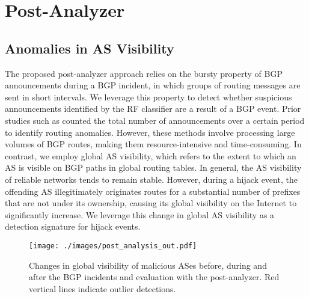 \vspace{-5pt}
\section{Post-Analyzer} \label{subsec:lov_post_analyzer}


\subsection{Anomalies in AS Visibility}
The proposed post-analyzer approach relies on the bursty property of BGP announcements during a BGP incident, in which groups of routing messages are sent in short intervals.
We leverage this property to detect whether suspicious announcements identified by the RF classifier are a result of a BGP event. Prior studies such as \cite{moriano2021using, deshpande2009online} counted the total number of announcements over a certain period to identify routing anomalies. However, these methods involve processing large volumes of BGP routes, making them resource-intensive and time-consuming.
In contrast, we employ global AS visibility, which refers to the extent to which an AS is visible on BGP paths in global routing tables.
In general, the AS visibility of reliable networks tends to remain stable. However, during a hijack event, the offending AS illegitimately originates routes for a substantial number of prefixes that are not under its ownership, causing its global visibility on the Internet to significantly increase. We leverage this change in global AS visibility as a detection signature for hijack events.
\begin{figure}[t!]
\centerline{\texttt{[image: ./images/post\_analysis\_out.pdf]}}
\vspace{-15pt}
\caption[Changes in global visibility of malicious ASes.]{\small{Changes in global visibility of malicious ASes before, during and after the BGP incidents and evaluation with the post-analyzer. Red vertical lines indicate outlier detections.}}
\label{fig:post_analysis}
\end{figure}

